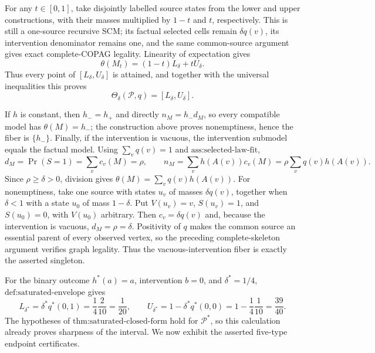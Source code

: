 For any \(t\in[0,1]\), take disjointly labelled source states from the lower and upper constructions, with their masses multiplied by \(1-t\) and \(t\), respectively.  This is still a one-source recursive SCM; its factual selected cells remain \(\delta q(v)\), its intervention denominator remains one, and the same common-source argument gives exact complete-COPAG legality.  Linearity of expectation gives
\[
\theta(M_t)=(1-t)L_\delta+tU_\delta.
\]
Thus every point of \([L_\delta,U_\delta]\) is attained, and together with the universal inequalities this proves
\[
\Theta_\delta(\mathcal P,q)=[L_\delta,U_\delta].
\]

If \(h\) is constant, then \(h_-=h_+\) and directly \(n_M=h_-d_M\), so every compatible model has \(\theta(M)=h_-\); the construction above proves nonemptiness, hence the fiber is \(\{h_-\}\).  Finally, if the intervention is vacuous, the intervention submodel equals the factual model.  Using \(\sum_vq(v)=1\) and \(\text{ass:selected-law-fit}\),
\[
d_M=\Pr(S=1)=\sum_v c_v(M)=\rho,
\qquad
n_M=\sum_v h(A(v))c_v(M)=\rho\sum_vq(v)h(A(v)).
\]
Since \(\rho\geq\delta>0\), division gives \(\theta(M)=\sum_vq(v)h(A(v))\).  For nonemptiness, take one source with states \(u_v\) of masses \(\delta q(v)\), together when \(\delta<1\) with a state \(u_0\) of mass \(1-\delta\).  Put \(V(u_v)=v\), \(S(u_v)=1\), and \(S(u_0)=0\), with \(V(u_0)\) arbitrary.  Then \(c_v=\delta q(v)\) and, because the intervention is vacuous, \(d_M=\rho=\delta\).  Positivity of \(q\) makes the common source an essential parent of every observed vertex, so the preceding complete-skeleton argument verifies graph legality.  Thus the vacuous-intervention fiber is exactly the asserted singleton.

For the binary outcome \(h^*(a)=a\), intervention \(b=0\), and \(\delta^*=1/4\), \(\text{def:saturated-envelope}\) gives
\[
L_{\delta^*}=\delta^*q^*(0,1)=\frac14\frac2{10}=\frac1{20},
\qquad
U_{\delta^*}=1-\delta^*q^*(0,0)=1-\frac14\frac1{10}=\frac{39}{40}.
\]
The hypotheses of \(\text{thm:saturated-closed-form}\) hold for \(\mathcal P^*\), so this calculation already proves sharpness of the interval.  We now exhibit the asserted five-type endpoint certificates.

